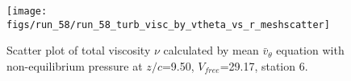 \begin{figure}[H]
\centering
\texttt{[image: figs/run\_58/run\_58\_turb\_visc\_by\_vtheta\_vs\_r\_meshscatter]}
\caption{Scatter plot of total viscosity $\nu$ calculated by mean $\bar{v}_{\theta}$ equation with non-equilibrium pressure at $z/c$=9.50, $V_{free}$=29.17, station 6.}
\label{fig:run_58_turb_visc_by_vtheta_vs_r_meshscatter}
\end{figure}


